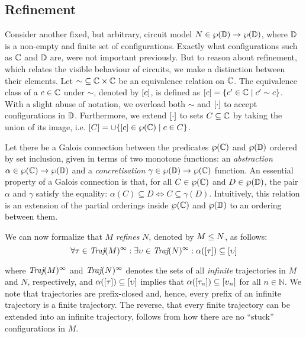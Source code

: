 \subsection{Refinement}

Consider another fixed, but arbitrary, circuit model $N \in \wp(\mathbb{D}) \rightarrow \wp(\mathbb{D})$, where $\mathbb{D}$ is a non-empty and finite set of configurations. Exactly what configurations such as $\mathbb{C}$ and $\mathbb{D}$ are, were not important previously. But to reason about refinement, which relates the visible behaviour of circuits, we make a distinction between their elements. Let ${\sim} \subseteq \mathbb{C} \times \mathbb{C}$ be an equivalence relation on $\mathbb{C}$. The equivalence class of a $c \in \mathbb{C}$ under $\sim$, denoted by $[c]$, is defined as $[c] = \{ c' \in \mathbb{C} \mid c' \sim c \}$. With a slight abuse of notation, we overload both $\sim$ and $[\cdot]$ to accept configurations in $\mathbb{D}$. Furthermore, we extend $[\cdot]$ to sets $C \subseteq \mathbb{C}$ by taking the union of its image, i.e. $[C] = \cup\{[c] \in \wp(\mathbb{C}) \mid c \in C \}$.


Let there be a Galois connection between the predicates $\wp(\mathbb{C})$ and $\wp(\mathbb{D})$ ordered by set inclusion, given in terms of two monotone functions: an \textit{abstraction} $\alpha \in \wp(\mathbb{C}) \rightarrow \wp(\mathbb{D})$ and a \textit{concretisation} $\gamma \in \wp(\mathbb{D}) \rightarrow \wp(\mathbb{C})$ function. An essential property of a Galois connection is that, for all $C \in \wp(\mathbb{C})$ and $D \in \wp(\mathbb{D})$, the pair $\alpha$ and $\gamma$ satisfy the equality: $\alpha(C) \subseteq D \iff C \subseteq \gamma(D)$. Intuitively, this relation is an extension of the partial orderings inside $\wp(\mathbb{C})$ and $\wp(\mathbb{D})$ to an ordering between them.  


We can now formalize that $M$ \textit{refines} $N$, denoted by $M \leq N$, as follows:
%
\begin{equation*}
\forall \tau \in \operatorname{\textit{Traj}}(M)^{\infty} : \exists \upsilon \in \operatorname{\textit{Traj}}(N)^{\infty} : \alpha([\tau]) \subseteq [\upsilon]
\end{equation*}

\noindent where $\operatorname{\textit{Traj}}(M)^{\infty}$ and $\operatorname{\textit{Traj}}(N)^{\infty}$ denotes the sets of all \textit{infinite} trajectories in $M$ and $N$, respectively, and $\alpha([\tau]) \subseteq [\upsilon]$ implies that $\alpha([\tau_{n}]) \subseteq [\upsilon_{n}]$ for all $n \in \mathbb{N}$. We note that trajectories are prefix-closed and, hence, every prefix of an infinite trajectory is a finite trajectory. The reverse, that every finite trajectory can be extended into an infinite trajectory, follows from how there are no ``stuck'' configurations in $M$. 
%

